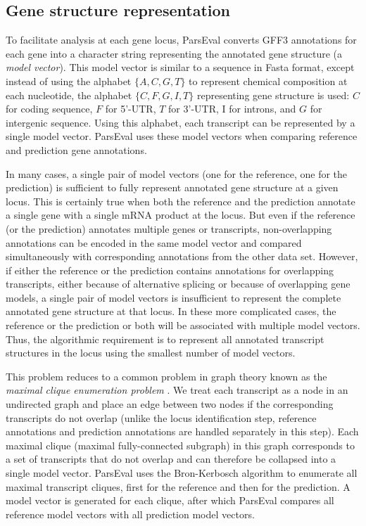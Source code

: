 \subsection{Gene structure representation}
To facilitate analysis at each gene locus, ParsEval converts GFF3 annotations for each gene into a character string representing the annotated gene structure (a \emph{model vector}).
This model vector is similar to a sequence in Fasta format, except instead of using the alphabet $\{ A, C, G, T \}$ to represent chemical composition at each nucleotide, the alphabet $\{ C, F, G, I, T \}$ representing gene structure is used: $C$ for coding sequence, $F$ for 5'-UTR, $T$ for 3'-UTR, I for introns, and $G$ for intergenic sequence.
Using this alphabet, each transcript can be represented by a single model vector.
ParsEval uses these model vectors when comparing reference and prediction gene annotations.

In many cases, a single pair of model vectors (one for the reference, one for the prediction) is sufficient to fully represent annotated gene structure at a given locus.
This is certainly true when both the reference and the prediction annotate a single gene with a single mRNA product at the locus.
But even if the reference (or the prediction) annotates multiple genes or transcripts, non-overlapping annotations can be encoded in the same model vector and compared simultaneously with corresponding annotations from the other data set.
However, if either the reference or the prediction contains annotations for overlapping transcripts, either because of alternative splicing or because of overlapping gene models, a single pair of model vectors is insufficient to represent the complete annotated gene structure at that locus.
In these more complicated cases, the reference or the prediction or both will be associated with multiple model vectors.
Thus, the algorithmic requirement is to represent all annotated transcript structures in the locus using the smallest number of model vectors.

This problem reduces to a common problem in graph theory known as the \emph{maximal clique enumeration problem} \citep{Bron}.
We treat each transcript as a node in an undirected graph and place an edge between two nodes if the corresponding transcripts do not overlap (unlike the locus identification step, reference annotations and prediction annotations are handled separately in this step).
Each maximal clique (maximal fully-connected subgraph) in this graph corresponds to a set of transcripts that do not overlap and can therefore be collapsed into a single model vector.
ParsEval uses the Bron-Kerbosch algorithm \citep{Bron} to enumerate all maximal transcript cliques, first for the reference and then for the prediction.
A model vector is generated for each clique, after which ParsEval compares all reference model vectors with all prediction model vectors.


